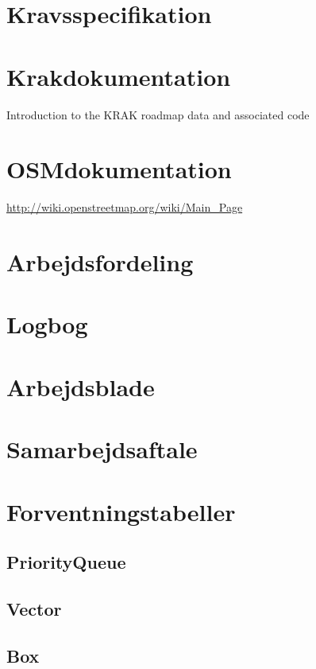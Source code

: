 \section{Kravsspecifikation}
\label{sec:Kravsspecifikation}


\label{sec:uml}


\section{Krakdokumentation}
\label{sec:Krakdokumentation1}
Introduction to the KRAK roadmap data and associated code


\label{sec:Krakdokumentation2}


\section{OSMdokumentation}
\url{http://wiki.openstreetmap.org/wiki/Main_Page}

\section{Arbejdsfordeling}
\label{sec:arbejdsfordeling}


\section{Logbog}
\label{sec:logbog}


\section{Arbejdsblade}
\label{sec:arbejdsblade}


\section{Samarbejdsaftale}
\label{sec:Samarbejdsaftale}


\label{sec:pq}


\section{Forventningstabeller}
\label{sec:forventningstabeller}
\subsection{PriorityQueue}

\clearpage

\clearpage
\subsection{Vector}

\clearpage
\subsection{Box}

\clearpage